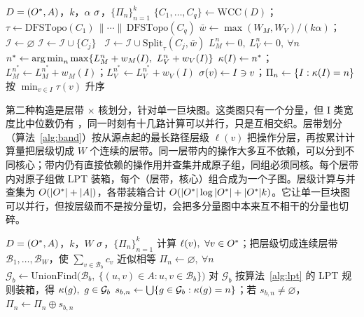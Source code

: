 \begin{algorithm}[H]
\caption{分量装箱与拓扑区间切分 $\mathrm{LPT}(D,k,\alpha)$}\label{alg:lpt}
\begin{algorithmic}[1]
\Require $D=(O^{\ast},A)$，$k$，$\alpha$
\Ensure $\sigma$，$\{\Pi_n\}_{n=1}^{k}$
\State $\{C_1,\dots,C_q\}\gets \mathrm{WCC}(D)$；$\tau\gets \mathrm{DFSTopo}(C_1)\,\|\cdots\|\,\mathrm{DFSTopo}(C_q)$
\State $\bar w\gets \max(W_M,W_V)/(k\alpha)$；$\mathcal{I}\gets\varnothing$
   $\mathcal{I}\gets\mathcal{I}\cup\{C_j\}$
  \Else\ $\mathcal{I}\gets\mathcal{I}\cup \mathrm{Split}_\tau(C_j,\bar w)$
  \EndIf
\EndFor
\State $L_M^n\gets 0,\ L_V^n\gets 0,\ \forall n$
  \State $n^*\gets\argmin_n \max\{L_M^n+w_M(I),\ L_V^n+w_V(I)\}$
  \State $\kappa(I)\gets n^*$；$L_M^{n^*}\gets L_M^{n^*}+w_M(I)$；$L_V^{n^*}\gets L_V^{n^*}+w_V(I)$
\EndFor
\State $\sigma(v)\gets I\ni v$；$\Pi_n\gets\{I:\kappa(I)=n\}$ 按 $\min_{v\in I}\tau(v)$ 升序
\end{algorithmic}
\end{algorithm}

第二种构造是层带 $\times$ 核划分，针对单一巨块图。这类图只有一个分量，但 I 类宽度比中位数仍有 ，同一时刻有十几路计算可以并行，只是互相交织。层带划分（算法~\ref{alg:band}）按从源点起的最长路径层级 $\ell(v)$ 把操作分层，再按累计计算量把层级切成 $W$ 个连续的层带。同一层带内的操作大多互不依赖，可以分到不同核心；带内仍有直接依赖的操作用并查集并成原子组，同组必须同核。每个层带内对原子组做 LPT 装箱，每个（层带，核心）组合成为一个子图。层级计算与并查集为 $O(|O^{\ast}|+|A|)$，各带装箱合计 $O(|O^{\ast}|\log|O^{\ast}|+|O^{\ast}|k)$。它让单一巨块图可以并行，但按层级而不是按分量切，会把多分量图中本来互不相干的分量也切碎。

\begin{algorithm}[H]
\caption{层带 $\times$ 核划分 $\mathrm{BAND}(D,k,W)$}\label{alg:band}
\begin{algorithmic}[1]
\Require $D=(O^{\ast},A)$，$k$，$W$
\Ensure $\sigma$，$\{\Pi_n\}_{n=1}^{k}$
\State 计算 $\ell(v),\ \forall v\in O^{\ast}$；把层级切成连续层带 $\mathcal{B}_1,\dots,\mathcal{B}_W$，使 $\sum_{v\in\mathcal{B}_b}c_v$ 近似相等
\State $\Pi_n\gets\varnothing,\ \forall n$
  \State $\mathcal{G}_b\gets \mathrm{UnionFind}\big(\mathcal{B}_b,\ \{(u,v)\in A:u,v\in\mathcal{B}_b\}\big)$
  \State 对 $\mathcal{G}_b$ 按算法~\ref{alg:lpt} 的 LPT 规则装箱，得 $\kappa(g),\ g\in\mathcal{G}_b$
    \State $s_{b,n}\gets\bigcup\{g\in\mathcal{G}_b:\kappa(g)=n\}$；若 $s_{b,n}\ne\varnothing$，$\Pi_n\gets\Pi_n\oplus s_{b,n}$
  \EndFor
\EndFor
\end{algorithmic}
\end{algorithm}

